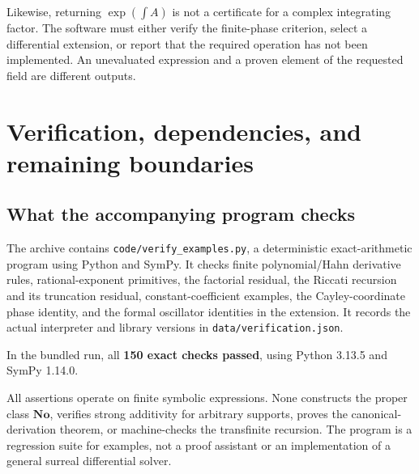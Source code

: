 \documentclass[11pt,letterpaper]{article}
\numberwithin{equation}{section}
\theoremstyle{definition}
\theoremstyle{remark}
\newcommand{\No}{\mathbf{No}}
\begin{document}
Likewise, returning $\exp(\int A)$ is not a certificate for a complex integrating factor. The software must either verify the finite-phase criterion, select a differential extension, or report that the required operation has not been implemented. An unevaluated expression and a proven element of the requested field are different outputs.

\section{Verification, dependencies, and remaining boundaries}\label{sec:verification}

\subsection{What the accompanying program checks}
The archive contains \texttt{code/verify\_examples.py}, a deterministic exact-arithmetic program using Python and SymPy. It checks finite polynomial/Hahn derivative rules, rational-exponent primitives, the factorial residual, the Riccati recursion and its truncation residual, constant-coefficient examples, the Cayley-coordinate phase identity, and the formal oscillator identities in the extension. It records the actual interpreter and library versions in \texttt{data/verification.json}.

In the bundled run, all \textbf{150 exact checks passed}, using Python 3.13.5 and SymPy 1.14.0.

All assertions operate on finite symbolic expressions. None constructs the proper class $\No$, verifies strong additivity for arbitrary supports, proves the canonical-derivation theorem, or machine-checks the transfinite recursion. The program is a regression suite for examples, not a proof assistant or an implementation of a general surreal differential solver.
\end{document}
